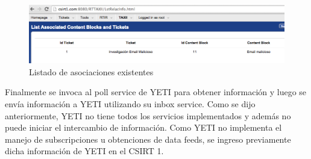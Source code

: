 \begin{figure}[H]
	\centering
	\includegraphics[scale=0.4]{caso-de-estudio/lstRelacInfo.png}
	\caption{Listado de asociaciones existentes}
	\label{fig.lstRelacInfo}
\end{figure}

Finalmente se invoca al poll service de YETI para obtener información y luego se envía información a YETI utilizando su inbox service. Como se dijo anteriormente, YETI no tiene todos los servicios implementados y además no puede iniciar el intercambio de información. Como YETI  no implementa el manejo de subscripciones u obtenciones de data feeds, se ingreso previamente dicha información de YETI en el CSIRT 1.